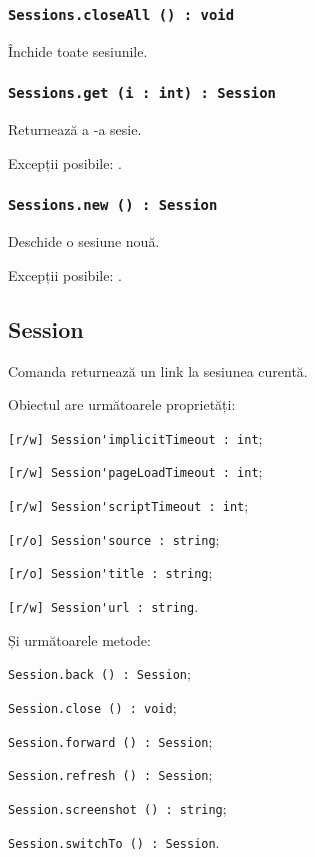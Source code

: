 \subsubsection{\lstinline|Sessions.closeAll () : void|}

Închide toate sesiunile.

\subsubsection{\lstinline|Sessions.get (i : int) : Session|}

Returnează a -a sesie.

Excepții posibile: .

\subsubsection{\lstinline|Sessions.new () : Session|}

Deschide o sesiune nouă.

Excepții posibile: .

\subsection{{\color{orange} Session}}

Comanda \session{} returnează un link la sesiunea curentă.

Obiectul \session{} are următoarele proprietăți:
\begin{icItems}
	\item \lstinline|[r/w] Session'implicitTimeout : int|;
	\item \lstinline|[r/w] Session'pageLoadTimeout : int|;
	\item \lstinline|[r/w] Session'scriptTimeout : int|;
	\item \lstinline|[r/o] Session'source : string|;
	\item \lstinline|[r/o] Session'title : string|;
	\item \lstinline|[r/w] Session'url : string|.
\end{icItems}

Și următoarele metode:
\begin{icItems}
	\item \lstinline|Session.back () : Session|;
	\item \lstinline|Session.close () : void|;
	\item \lstinline|Session.forward () : Session|;
	\item \lstinline|Session.refresh () : Session|;
	\item \lstinline|Session.screenshot () : string|;
	\item \lstinline|Session.switchTo () : Session|.
\end{icItems}

